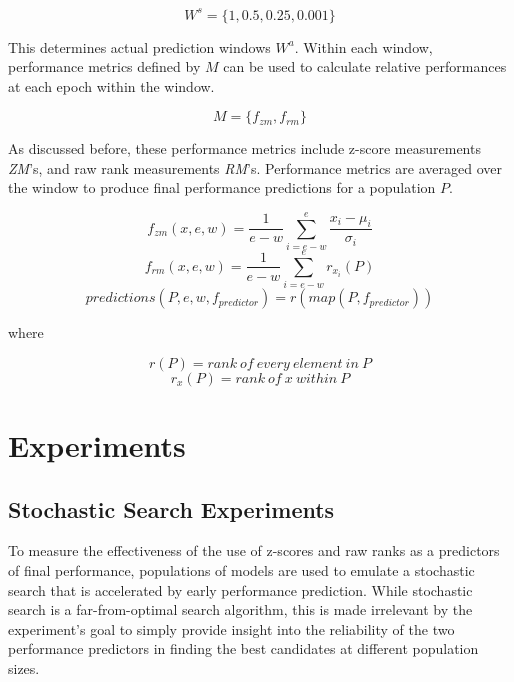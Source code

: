 \documentclass[twocolumn]{article}
\begin{document}
\[W^s = \{1, 0.5, 0.25, 0.001\}\]

This determines actual prediction windows $W^a$.
Within each window, performance metrics defined by $M$ can be used to calculate relative performances at each epoch within the window.

\[M = \{f_{zm}, f_{rm}\}\]

As discussed before, these performance metrics include z-score measurements \emph{ZM}'s, and raw rank measurements \emph{RM}'s.
Performance metrics are averaged over the window to produce final performance predictions for a population $P$.

\[f_{zm}(x, e, w) = \frac{1}{e-w}\sum_{i=e-w}^{e}\frac{x_i - \mu_i}{\sigma_i}\]
\[f_{rm}(x, e, w) = \frac{1}{e-w}\sum_{i=e-w}^{e}r_{x_{i}}(P)\]
\[predictions(P, e, w, f_{predictor}) = r(map(P, f_{predictor}))\]
\begin{center}
where
\end{center}
\[r(P) = rank\ of\ every\ element\ in\ P\]
\[r_{x}(P) = rank\ of\ x\ within\ P\]

\section{Experiments}

\subsection{Stochastic Search Experiments}
To measure the effectiveness of the use of z-scores and raw ranks as a predictors of final performance, populations of models are used to
emulate a stochastic search that is accelerated by early performance prediction. 
While stochastic search is a far-from-optimal search algorithm, this is made irrelevant by the experiment's goal to simply provide insight into the reliability 
of the two performance predictors in finding the best candidates at different population sizes. 
\end{document}
